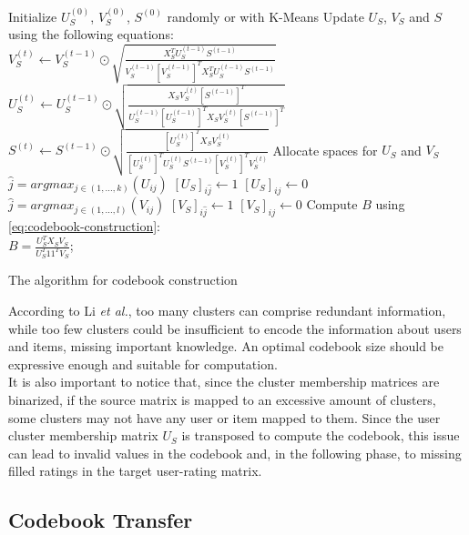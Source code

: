 \begin{algorithm}[H]
Initialize $U_S^{(0)}$, $V_S^{(0)}$, $S^{(0)}$ randomly or with K-Means\;
{
  Update $U_S$, $V_S$ and $S$ using the following equations:\\
  $V_S^{(t)} \gets V_S^{(t - 1)} \odot \sqrt{\frac{X_S^T U_S^{(t - 1)} S^{(t - 1)}}{V_S^{(t - 1)} [V_S^{(t - 1)}]^T X_S^T U_S^{(t - 1)} S^{(t - 1)}}}$\;
  $U_S^{(t)} \gets U_S^{(t - 1)} \odot \sqrt{\frac{X_S V_S^{(t)} [S^{(t - 1)}]^T}{U_S^{(t - 1)} [U_S^{(t - 1)}]^T X_S V_S^{(t)} [S^{(t - 1)}]^T}}$\;
  $S^{(t)} \gets S^{(t - 1)} \odot \sqrt{\frac{[U_S^{(t)}]^T X_S V_S^{(t)}}{[U_S^{(t)}]^T U_S^{(t)} S^{(t - 1)} [V_S^{(t)}]^T V_S^{(t)}}}$\;
}
Allocate spaces for $U_S$ and $V_S$\;
{
  $\hat{j} = argmax_{j \in (1,...,k)}(U_{ij})$\;
  $[U_S]_{i\hat{j}} \gets 1$\;
  {
    $[U_S]_{ij} \gets 0$\;
  }
}
{
  $\hat{j} = argmax_{j \in (1,...,l)}(V_{ij})$\;
  $[V_S]_{i\hat{j}} \gets 1$\;
  {
    $[V_S]_{ij} \gets 0$\;
  }
}
Compute $B$ using \autoref{eq:codebook-construction}:\\
$B = \frac{U_S^T X_S V_S}{U_S^T 1 1^T V_S}$;
\caption{The algorithm for codebook construction}
\end{algorithm}
\vskip 0.7cm
According to Li \textit{et al.}, too many clusters can comprise redundant information, while too few clusters could be insufficient to encode the information about users and items, missing important knowledge. An optimal codebook size should be expressive enough and suitable for computation.\\
It is also important to notice that, since the cluster membership matrices are binarized, if the source matrix is mapped to an excessive amount of clusters, some clusters may not have any user or item mapped to them. Since the user cluster membership matrix $U_S$ is transposed to compute the codebook, this issue can lead to invalid values in the codebook and, in the following phase, to missing filled ratings in the target user-rating matrix.


\subsection{Codebook Transfer}
\label{ss:codebook-transfer}

